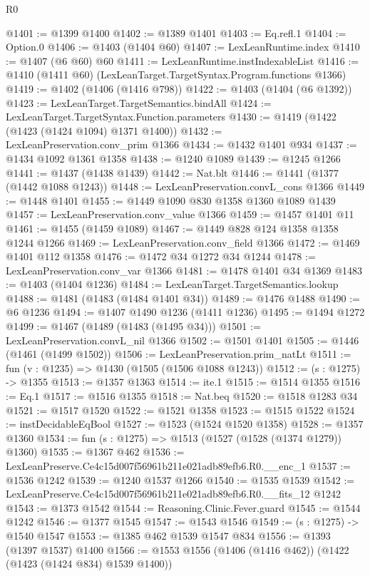 \begin{lexlean}{R0}
\begin{coremodule}
@1401 := @1399 @1400
@1402 := @1389 @1401
@1403 := Eq.refl.{1}
@1404 := Option.{0}
@1406 := @1403 (@1404 @60)
@1407 := LexLeanRuntime.index
@1410 := @1407 (@6 @60) @60
@1411 := LexLeanRuntime.instIndexableList
@1416 := @1410 (@1411 @60) (LexLeanTarget.TargetSyntax.Program.functions @1366)
@1419 := @1402 (@1406 (@1416 @798))
@1422 := @1403 (@1404 (@6 @1392))
@1423 := LexLeanTarget.TargetSemantics.bindAll
@1424 := LexLeanTarget.TargetSyntax.Function.parameters
@1430 := @1419 (@1422 (@1423 (@1424 @1094) @1371 @1400))
@1432 := LexLeanPreservation.conv_prim @1366
@1434 := @1432 @1401 @934
@1437 := @1434 @1092 @1361 @1358
@1438 := @1240 @1089
@1439 := @1245 @1266
@1441 := @1437 (@1438 @1439)
@1442 := Nat.blt
@1446 := @1441 (@1377 (@1442 @1088 @1243))
@1448 := LexLeanPreservation.convL_cons @1366
@1449 := @1448 @1401
@1455 := @1449 @1090 @830 @1358 @1360 @1089 @1439
@1457 := LexLeanPreservation.conv_value @1366
@1459 := @1457 @1401 @11
@1461 := @1455 (@1459 @1089)
@1467 := @1449 @828 @124 @1358 @1358 @1244 @1266
@1469 := LexLeanPreservation.conv_field @1366
@1472 := @1469 @1401 @112 @1358
@1476 := @1472 @34 @1272 @34 @1244
@1478 := LexLeanPreservation.conv_var @1366
@1481 := @1478 @1401 @34 @1369
@1483 := @1403 (@1404 @1236)
@1484 := LexLeanTarget.TargetSemantics.lookup
@1488 := @1481 (@1483 (@1484 @1401 @34))
@1489 := @1476 @1488
@1490 := @6 @1236
@1494 := @1407 @1490 @1236 (@1411 @1236)
@1495 := @1494 @1272
@1499 := @1467 (@1489 (@1483 (@1495 @34)))
@1501 := LexLeanPreservation.convL_nil @1366
@1502 := @1501 @1401
@1505 := @1446 (@1461 (@1499 @1502))
@1506 := LexLeanPreservation.prim_natLt
@1511 := fun (v : @1235) => @1430 (@1505 (@1506 @1088 @1243))
@1512 := (s : @1275) -> @1355
@1513 := @1357 @1363
@1514 := ite.{1}
@1515 := @1514 @1355
@1516 := Eq.{1}
@1517 := @1516 @1355
@1518 := Nat.beq
@1520 := @1518 @1283 @34
@1521 := @1517 @1520
@1522 := @1521 @1358
@1523 := @1515 @1522
@1524 := instDecidableEqBool
@1527 := @1523 (@1524 @1520 @1358)
@1528 := @1357 @1360
@1534 := fun (s : @1275) => @1513 (@1527 (@1528 (@1374 @1279)) @1360)
@1535 := @1367 @462
@1536 := LexLeanPreserve.Ce4c15d007f56961b211e021adb89efb6.R0.__enc_1
@1537 := @1536 @1242
@1539 := @1240 @1537 @1266
@1540 := @1535 @1539
@1542 := LexLeanPreserve.Ce4c15d007f56961b211e021adb89efb6.R0.__fits_12 @1242
@1543 := @1373 @1542
@1544 := Reasoning.Clinic.Fever.guard
@1545 := @1544 @1242
@1546 := @1377 @1545
@1547 := @1543 @1546
@1549 := (s : @1275) -> @1540 @1547
@1553 := @1385 @462 @1539 @1547 @834
@1556 := @1393 (@1397 @1537) @1400
@1566 := @1553 @1556 (@1406 (@1416 @462)) (@1422 (@1423 (@1424 @834) @1539 @1400))

\end{coremodule}
\end{lexlean}

